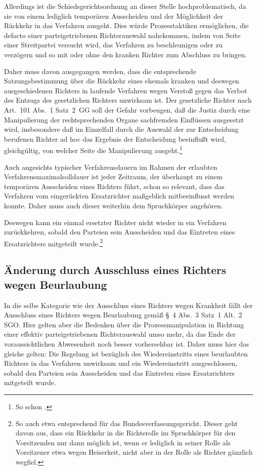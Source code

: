 Allerdings ist die Schiedsgerichtsordnung an dieser Stelle hochproblematisch, da sie von einem lediglich temporären Ausscheiden und der Möglichkeit der Rückkehr in das Verfahren ausgeht.
Dies würde Prozesstaktiken ermöglichen, die defacto einer parteigetriebenen Richterauswahl nahekommen, indem von Seite einer Streitpartei versucht wird, das Verfahren zu beschleunigen oder zu verzögern und so mit oder ohne den kranken Richter zum Abschluss zu bringen. 

Daher muss davon ausgegangen werden, dass die entsprechende Satzungsbestimmung über die Rückkehr eines ehemals kranken und deswegen ausgeschiedenen Richters in laufende Verfahren wegen Verstoß gegen das Verbot des Entzugs des gesetzlichen Richters unwirksam ist. Der gesetzliche Richter nach Art.~101 Abs.~1 Satz~2~GG soll der Gefahr vorbeugen, daß die Justiz durch eine Manipulierung der rechtsprechenden Organe sachfremden Einflüssen ausgesetzt wird, insbesondere daß im Einzelfall durch die Auswahl der zur Entscheidung berufenen Richter ad hoc das Ergebnis der Entscheidung beeinflußt wird, gleichgültig, von welcher Seite die Manipulierung ausgeht.\footnote{So schon \cite[299]{BVerfGE17294}.}

Auch angesichts typischer Verfahrensdauern im Rahmen der erlaubten Verfahrensmaximalsolldauer ist jeder Zeitraum, der überhaupt zu einem temporären Ausscheiden eines Richters führt, schon so relevant, dass das Verfahren vom eingerückten Ersatzrichter maßgeblich mitbeeinflusst werden konnte.
Daher muss auch dieser weiterhin dem Spruchkörper angehören.

Deswegen kann ein einmal ersetzter Richter nicht wieder in ein Verfahren zurückkehren, sobald den Parteien sein Ausscheiden und das Eintreten eines Ersatzrichters mitgeteilt wurde.\footnote{So auch etwa \cite[Eschelbach][\S~15 Rn~31]{BVerfGGMitarbeiterKommentar} entsprechend für das Bundesverfassungsgericht. Dieser geht davon aus, dass ein Rückkehr in die Richterolle im Spruchkörper für den Vorsitzenden nur dann möglich ist, wenn er lediglich in seiner Rolle als Vorsitzener etwa wegen Heiserkeit, nicht aber in der Rolle als Richter gänzlich wegfiel.}

\subsection{Änderung durch Ausschluss eines Richters wegen Beurlaubung}
\label{Zusammensetzung:Spruchkoerper:Urlaub}
In die selbe Kategorie wie der Ausschluss eines Richters wegen Krankheit fällt der Ausschluss eines Richters wegen Beurlaubung gemäß \S~4 Abs.~3 Satz~1 Alt.~2 SGO.
Hier gelten aber die Bedenken über die Prozessmanipulation in Richtung einer effektiv parteigetriebenen Richterauswahl umso mehr, da das Ende der voraussichtlichen Abwesenheit noch besser vorhersehbar ist.
Daher muss hier das gleiche gelten: Die Regelung ist bezüglich des Wiedereinstritts eines beurlaubten Richters in das Verfahren unwirksam und ein Wiedereinstritt ausgeschlossen, sobald den Parteien sein Ausscheiden und das Eintreten eines Ersatzrichters mitgeteilt wurde.


